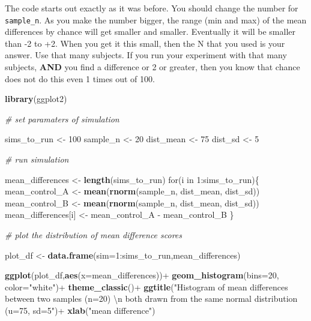 \documentclass[]{book}
\newenvironment{Shaded}{\begin{snugshade}}{\end{snugshade}}
\newcommand{\KeywordTok}[1]{\textcolor[rgb]{0.13,0.29,0.53}{\textbf{{#1}}}}
\newcommand{\DataTypeTok}[1]{\textcolor[rgb]{0.13,0.29,0.53}{{#1}}}
\newcommand{\DecValTok}[1]{\textcolor[rgb]{0.00,0.00,0.81}{{#1}}}
\newcommand{\CharTok}[1]{\textcolor[rgb]{0.31,0.60,0.02}{{#1}}}
\newcommand{\StringTok}[1]{\textcolor[rgb]{0.31,0.60,0.02}{{#1}}}
\newcommand{\CommentTok}[1]{\textcolor[rgb]{0.56,0.35,0.01}{\textit{{#1}}}}
\newcommand{\NormalTok}[1]{{#1}}
\theoremstyle{definition}
\theoremstyle{definition}
\theoremstyle{definition}
\theoremstyle{remark}
\begin{document}
The code starts out exactly as it was before. You should change the
number for \texttt{sample\_n}. As you make the number bigger, the range
(min and max) of the mean differences by chance will get smaller and
smaller. Eventually it will be smaller than -2 to +2. When you get it
this small, then the N that you used is your answer. Use that many
subjects. If you run your experiment with that many subjects,
\textbf{AND} you find a difference or 2 or greater, then you know that
chance does not do this even 1 times out of 100.

\begin{Shaded}
\begin{Highlighting}[]
\KeywordTok{library}\NormalTok{(ggplot2)}

\CommentTok{# set paramaters of simulation}

\NormalTok{sims_to_run <-}\StringTok{ }\DecValTok{100}
\NormalTok{sample_n   <-}\StringTok{ }\DecValTok{20}
\NormalTok{dist_mean  <-}\StringTok{ }\DecValTok{75}
\NormalTok{dist_sd    <-}\StringTok{ }\DecValTok{5}

\CommentTok{# run simulation}

\NormalTok{mean_differences <-}\StringTok{ }\KeywordTok{length}\NormalTok{(sims_to_run)}
\NormalTok{for(i in }\DecValTok{1}\NormalTok{:sims_to_run)\{}
  \NormalTok{mean_control_A      <-}\StringTok{ }\KeywordTok{mean}\NormalTok{(}\KeywordTok{rnorm}\NormalTok{(sample_n, dist_mean, dist_sd))}
  \NormalTok{mean_control_B      <-}\StringTok{ }\KeywordTok{mean}\NormalTok{(}\KeywordTok{rnorm}\NormalTok{(sample_n, dist_mean, dist_sd))}
  \NormalTok{mean_differences[i] <-}\StringTok{ }\NormalTok{mean_control_A -}\StringTok{ }\NormalTok{mean_control_B}
\NormalTok{\}}

\CommentTok{# plot the  distribution of mean difference scores}

\NormalTok{plot_df <-}\StringTok{ }\KeywordTok{data.frame}\NormalTok{(}\DataTypeTok{sim=}\DecValTok{1}\NormalTok{:sims_to_run,mean_differences)}

\KeywordTok{ggplot}\NormalTok{(plot_df,}\KeywordTok{aes}\NormalTok{(}\DataTypeTok{x=}\NormalTok{mean_differences))+}
\StringTok{  }\KeywordTok{geom_histogram}\NormalTok{(}\DataTypeTok{bins=}\DecValTok{20}\NormalTok{, }\DataTypeTok{color=}\StringTok{"white"}\NormalTok{)+}
\StringTok{  }\KeywordTok{theme_classic}\NormalTok{()+}
\StringTok{  }\KeywordTok{ggtitle}\NormalTok{(}\StringTok{"Histogram of mean differences between two samples (n=20) }\CharTok{\textbackslash{}n}
\StringTok{          both drawn from the same normal distribution (u=75, sd=5"}\NormalTok{)+}
\StringTok{  }\KeywordTok{xlab}\NormalTok{(}\StringTok{"mean difference"}\NormalTok{)}
\end{Highlighting}
\end{Shaded}
\end{document}
